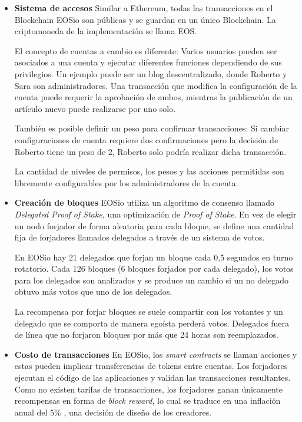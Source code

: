 \begin{itemize}
\item \textbf{Sistema de accesos} \newline
Similar a Ethereum, todas las transacciones en el Blockchain EOSio son públicas y se guardan en un único Blockchain. La criptomoneda de la implementación se llama EOS.

El concepto de cuentas a cambio es diferente: Varios usuarios pueden ser asociados a una cuenta y ejecutar diferentes funciones dependiendo de sus privilegios. Un ejemplo puede ser un blog descentralizado, donde Roberto y Sara son administradores. Una transacción que modifica la configuración de la cuenta puede requerir la aprobación de ambos, mientras la publicación de un artículo nuevo puede realizarse por uno solo.\cite{eosio_tech_whitepaper}

También es posible definir un peso para confirmar transacciones: Si cambiar configuraciones de cuenta requiere dos confirmaciones pero la decisión de Roberto tiene un peso de 2, Roberto solo podría realizar dicha transacción.

La cantidad de niveles de permisos, los pesos y las acciones permitidas son libremente configurables por los administradores de la cuenta.

\item \textbf{Creación de bloques} \newline
EOSio utiliza un algoritmo de consenso llamado \textit{Delegated Proof of Stake}, una optimización de \textit{Proof of Stake}. En vez de elegir un nodo forjador de forma aleatoria para cada bloque, se define una cantidad fija de forjadores llamados delegados a través de un sistema de votos.

En EOSio hay 21 delegados que forjan un bloque cada 0,5 segundos en turno rotatorio. Cada 126 bloques (6 bloques forjados por cada delegado), los votos para los delegados son analizados y se produce un cambio si un no delegado obtuvo más votos que uno de los delegados. 

La recompensa por forjar bloques se suele compartir con los votantes y un delegado que se comporta de manera egoísta perderá votos. Delegados fuera de línea que no forjaron bloques por más que 24 horas son reemplazados.

\item \textbf{Costo de transacciones} \newline
En EOSio, los \textit{smart contracts} se llaman acciones y estas pueden implicar transferencias de tokens entre cuentas. Los forjadores ejecutan el código de las aplicaciones y validan las transacciones resultantes. Como no existen tarifas de transacciones, los forjadores ganan únicamente recompensas en forma de \textit{block reward}, lo cual se traduce en una inflación anual del 5\% \cite{eosio_tech_whitepaper}, una decisión de diseño de los creadores.


\end{itemize}
